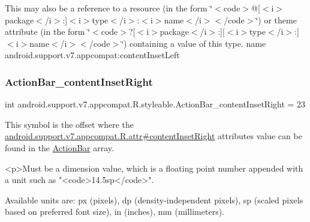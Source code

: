 This may also be a reference to a resource (in the form \char`\"{}$<$code$>$@\mbox{[}$<$i$>$package$<$/i$>$\+:\mbox{]}$<$i$>$type$<$/i$>$\+:$<$i$>$name$<$/i$>$$<$/code$>$\char`\"{}) or theme attribute (in the form \char`\"{}$<$code$>$?\mbox{[}$<$i$>$package$<$/i$>$\+:\mbox{]}\mbox{[}$<$i$>$type$<$/i$>$\+:\mbox{]}$<$i$>$name$<$/i$>$$<$/code$>$\char`\"{}) containing a value of this type.  name android.\+support.\+v7.\+appcompat\+:content\+Inset\+Left \mbox{\label{classandroid_1_1support_1_1v7_1_1appcompat_1_1R_1_1styleable_a03934a093a17b752258be0f5b6fef2f6}} 
\subsubsection{\texorpdfstring{Action\+Bar\+\_\+content\+Inset\+Right}{ActionBar\_contentInsetRight}}
{\footnotesize\ttfamily int android.\+support.\+v7.\+appcompat.\+R.\+styleable.\+Action\+Bar\+\_\+content\+Inset\+Right = 23\hspace{0.3cm}{\ttfamily [static]}}

This symbol is the offset where the \hyperlink{classandroid_1_1support_1_1v7_1_1appcompat_1_1R_1_1attr_a608654504a7bff330119bfa1462d385a}{android.\+support.\+v7.\+appcompat.\+R.\+attr\#content\+Inset\+Right} attribute\textquotesingle{}s value can be found in the \hyperlink{classandroid_1_1support_1_1v7_1_1appcompat_1_1R_1_1styleable_a5941dc15714398e9ec9afaa0155cc1cf}{Action\+Bar} array.

\begin{DoxyVerb}      <p>Must be a dimension value, which is a floating point number appended with a unit such as "<code>14.5sp</code>".
\end{DoxyVerb}
 Available units are\+: px (pixels), dp (density-\/independent pixels), sp (scaled pixels based on preferred font size), in (inches), mm (millimeters). 

